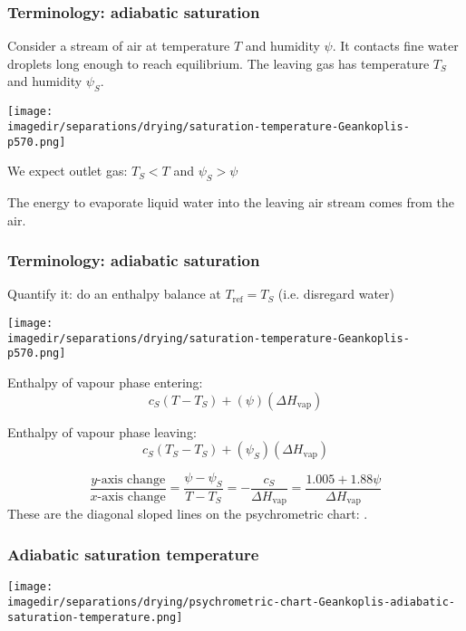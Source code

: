 \begin{frame}\frametitle{Terminology: adiabatic saturation}
	Consider a stream of air at temperature $T$ and humidity $\psi$. It contacts fine water droplets long enough to reach equilibrium. The leaving gas has temperature $T_S$ and humidity $\psi_S$.
		
	\begin{center}
		\texttt{[image: \\imagedir/separations/drying/saturation-temperature-Geankoplis-p570.png]}
		
		\vspace{-12pt}
		\hfill{}
	\end{center}

	We expect outlet gas: $T_S < T$ and $\psi_S > \psi$
	
	\vspace{6pt}
	The energy to evaporate liquid water into the leaving air stream comes from the air.
\end{frame}

\begin{frame}\frametitle{Terminology: adiabatic saturation}
	Quantify it: do an enthalpy balance at $T_\text{ref} = T_S$ {\scriptsize (i.e. disregard water)}
	\begin{center}
		\texttt{[image: \\imagedir/separations/drying/saturation-temperature-Geankoplis-p570.png]}
	\end{center}
	\vspace{-6pt}
	\begin{exampleblock}{Enthalpy of vapour phase entering:}
		\[c_S\left(T - T_S \right) + (\psi) (\Delta H_\text{vap})\]
	\end{exampleblock}
	\begin{exampleblock}{Enthalpy of vapour phase leaving:}
		\[c_S\left(T_S - T_S \right) + (\psi_S) (\Delta H_\text{vap})\]
	\end{exampleblock}
	
	\[	
		\displaystyle \frac{y\text{-axis change}}{x\text{-axis change}} = \frac{\psi - \psi_S}{T - T_S} = - \frac{c_S}{\Delta H_\text{vap}} = \frac{1.005 + 1.88 \psi}{\Delta H_\text{vap}}
	\]
	These are the diagonal sloped lines on the psychrometric chart: {\color{purple}{adiabatic saturation curves}}.
\end{frame}

\begin{frame}\frametitle{Adiabatic saturation temperature}
	\vfill
	\begin{center}
		\texttt{[image: \\imagedir/separations/drying/psychrometric-chart-Geankoplis-adiabatic-saturation-temperature.png]}
	\end{center}
\end{frame}

